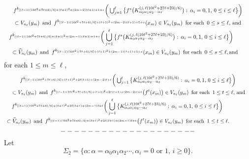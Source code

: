 \documentclass[12pt]{article}
\newcommand{\al}{\alpha}
\begin{document}
\begin{multline*}
$$
f^{k_{[(\ell-1)(10\ell^2+7\ell+6)/6]+(\ell+1)^2+(2m-2)(\ell+1)+1+s}}\bigg(\bigcup_{j=1}^\ell \big\{ f^s\big(K_{\al_0\al_1\al_2\cdots\al_\ell}^{(j, \, \ell(10\ell^2+27\ell+23)/6)}\big): \, \al_i = 0, 1, \, 0 \le i \le \ell \big\}\bigg) \\ 
\subset V_{n_\ell}(y_m) \,\,\, \text{and} \,\,\, f^{k_{[(\ell-1)(10\ell^2+7\ell+6)/6]+(\ell+1)^2+(2m-2)(\ell+1)+1+s}}(x_m) \in V_{n_\ell}(y_m) \,\,\, \text{for each} \,\,\, 0 \le s \le \ell, \, \text{and} \\
\,\,\,\,\, f^{k_{[(\ell-1)(10\ell^2+7\ell+6)/6]+(\ell+1)^2+(2m-1)(\ell+1)+1+s}}\bigg(\bigcup_{j=1}^\ell \big\{f^s\big(K_{\al_0\al_1\al_2\cdots\al_\ell}^{(j, \, \ell(10\ell^2+27\ell+23)/6)}\big): \, \al_i = 0, 1, \, 0 \le i \le \ell \big\}\bigg) \qquad\quad\,\, \\ 
\quad\,\,\, \subset \widehat V_{n_\ell}(y_m) \,\,\, \text{and} \,\,\, f^{k_{[(\ell-1)(10\ell^2+7\ell+6)/6]+(\ell+1)^2+(2m-1)(\ell+1)+1+s}}(x_m) \in V_{n_\ell}(y_m) \,\,\, \text{for each} \,\,\, 0 \le s \le \ell, \text{and} \qquad\,\,\,
$$
\end{multline*}
for each $1 \le m \le \ell$, 
\begin{multline*}
$$
f^{k_{[(\ell-1)(10\ell^2+7\ell+6)/6]+(\ell+1)^2+2\ell(\ell+1)+(2m-2)\ell+t}}\bigg(\bigcup_{j=1}^\ell \big\{ K_{\al_0\al_1\al_2\cdots\al_\ell}^{(j, \,\ell(10\ell^2+27\ell+23)/6)}: \, \al_i = 0, 1, \, 0 \le i \le \ell \big\}\bigg) \\ 
\,\, \subset V_{n_\ell}(y_m) \,\,\, \text{and} \,\,\, f^{k_{[(\ell-1)(10\ell^2+7\ell+6)/6]+(\ell+1)^2+2\ell(\ell+1)+(2m-2)\ell+t}}\big(f^{t}(x_m)\big) \in V_{n_\ell}(y_m) \,\,\, \text{for each} \,\,\, 1 \le t \le \ell, \, \text{and} \\
\,\,\,\,\, f^{k_{[(\ell-1)(10\ell^2+7\ell+6)/6]+(\ell+1)^2+2\ell(\ell+1)+(2m-1)\ell+t}}\bigg(\bigcup_{j=1}^\ell \big\{ K_{\al_0\al_1\al_2\cdots\al_\ell}^{(j, \,\ell(10\ell^2+27\ell+23)/6)}: \, \al_i = 0, 1, \, 0 \le i \le \ell \big\}\bigg) \qquad\qquad\,\,\,\,\, \\ 
\,\,\, \subset \widehat V_{n_\ell}(y_m) \,\,\, \text{and} \,\,\, f^{k_{[(\ell-1)(10\ell^2+7\ell+6)/6]+(\ell+1)^2+2\ell(\ell+1)+(2m-1)\ell+t}}\big(f^{t}(x_m)\big) \in V_{n_\ell}(y_m) \,\,\, \text{for each} \,\,\, 1 \le t \le \ell.\qquad\qquad\,
$$
\end{multline*}
$$--------------------\vspace{.1in}$$
\indent Let
$$
\Sigma_2 = \{ \al : \al = \al_0\al_1\al_2 \cdots, \al_i = 0 \,\, \text{or} \,\, 1, \, i \ge 0 \}.
$$
\end{document}
